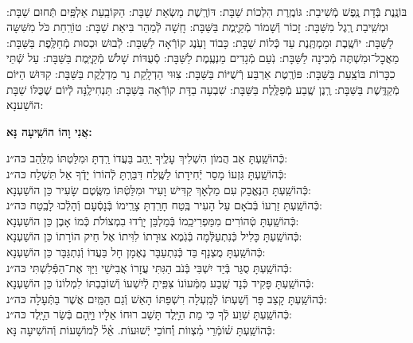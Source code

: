 \documentclass[twoside, openany, parskip=half, 11pt]{book}
\begin{document}
\sepline

\\
בּוֹנֶֽנֶת בְּֿדָת נֶֽפֶשׁ מְֿשִׁיבַת: גּוֹמֶֽרֶת הִלְכוֹת שַׁבָּת: דּוֹרֶֽשֶׁת מַשְׂאַת שַׁבָּת: הַקּוֹבַֽעַת אַלְפַּֽיִם תְּֿחוּם שַׁבָּת: וּמְשִֽׁיבַת רֶֽגֶל מִשַּׁבָּת: זָכוֹר וְֿשָׁמוֹר מְֿקַיֶּֽמֶת בַּשַּׁבָּת: חָֽשָׁה לְֿמַהֵר בִּיאַת שַׁבָּת: טוֹרַֽחַת כֹּל מִשִּׁשָּה לַשַּׁבָּת: יוֹשֶֽׁבֶת וּמַמְתֶּֽנֶת עַד כְּֿלוֹת שַׁבָּת: כָּבוֹד וָעֹֽנֶג קוֹרְֿאָה לַשַּׁבָּת: לְֿבוּשׁ וּכְסוּת מְֿחַלֶּֽפֶת בַּשַּׁבָּת: מַאֲכׇל־וּמִשְׁתֶּה מְֿכִינָה לַשַּׁבָּת: נֹֽעַם מְֿגָדִים מַנְעֶֽמֶת לַשַּׁבָּת: סְֿעֻדּוֹת שָׁלֹשׁ מְֿקַיֶּֽמֶת בַּשַּׁבָּת: עַל שְֿׁתֵּי כִכָּרוֹת בּוֹצַֽעַת בַּשַּׁבָּת: פּוֹרֶֽטֶת אַרְבַּע רְֿשֻׁיּוֹת בַּשַּׁבָּת: צִוּוּי הַדְלָֽקַת נֵר מַדְלֶֽקֶת בַּשַּׁבָּת: קִדּוּשׁ הַיּוֹם מְֿקַדֶּֽשֶׁת בַּשַּׁבָּת: רֶֽנֶן שֶֽׁבַע מְֿפַלֶּֽלֶת בַּשַּׁבָּת: שִׁבְעָה בַדָּת קוֹרְֿאָה בַּשַּׁבָּת: תַּנְחִילֶֽנָּה לְֿיוֹם שֶׁכֻּלּוֹ שַׁבָּת הוֹשַׁענָא:

\begin{large}
	\textbf{אֲנִי וָהוֹ הוֹשִֽׁיעָה נָּא:}
\end{large}

\begin{small}
	כְּֿהוֹשַֽׁעְתָּ אַב הֲמוֹן הִשְׁלִיךְ עָלֶֽיךָ יַֽהַב בַּעֲדוֹ רַֽדְתָּ וּמִלַּטְתּוֹ מִלַּֽהַב \hfill כּה״נ:\\
	כְּֿהוֹשַֽׁעְתָּ גִּזְעוֹ מָסַר יְֿחִידָתוֹ לַשֶּֽׁלַח דִּבַּרְֽתָּ לְֿהוֹרוֹ יָדְֿךָ אַל תִּשְׁלַח \hfill כּה״נ: \\
	כְּֿהוֹשַֽׁעְתָּ הַנֶּאֱבַק עִם מַלְאָךְ קַדִּישׁ וָעִיר וּמִלַּטְֿתּוֹ מִשֶּֽׂטֶם שָׂעִיר \hfill כֵּן הוֹשַׁעְנָא: \\
	כְּֿהוֹשַֽׁעְתָּ זַרְעוֹ בְּֿבֹאָם עַל הָעִיר בֶּֽטַח חָרַֽדְתָּ צָרֵֽימוֹ בְּֿנָסְֿעָם וְֿהָלְֿכוּ לָבֶֽטַח \hfill כּה״נ: \\
	כְּֿהוֹשַֽׁעְתָּ טְֿהוֹרִים מִמַּפְרִיכֵֽמוֹ בְּֿמַלְבֵּן יָרְֿדוּ בִמְצוֹלֹת כְּֿמוֹ אָבֶן \hfill כֵּן הוֹשַׁעְנָא: \\
	כְּֿהוֹשַֽׁעְתָּ כָּלִיל כְּֿנִתְעַלְּֿמָה בְּֿגֹֽמֶא צוּרָתוֹ לִוִּיתוֹ אֶל חֵיק הוֹרָתוֹ \hfill כֵּן הוֹשַׁעְנָא: \\
	כְּֿהוֹשַֽׁעְתָּ מֻצְנָף בַּד כְּֿנִתְעַבָּר נֶאֶמָן חָל בַּעֲדוֹ וְֿנִתְגַּבָּר \hfill כֵּן הוֹשַׁעְנָא: \\
	כְּֿהוֹשַֽׁעְתָּ סֻגַּר בְּֿיַד יִשְׁבִּי בְּֿנֹב הַגִּתִּי עֲזָרוֹ אֲבִישַׁי וַיַּךְ אֶת־הַפְּֿלִשְׁתִּי \hfill כּה״נ:\\
	כְּֿהוֹשַֽׁעְתָּ פָּקִיד כְּֿנָד שֶֽׁבַע מִמְּֿעוֹנוֹ צִּפִּֽיתָ לְֿיִשְׁעוֹ וְֿשׁוֹבַבְתּוֹ לִמְלוֹנוֹ \hfill כֵּן הוֹשַׁעְנָא:\\
	כְּֿהוֹשַֽׁעְתָּ קָצַב פָּר וְֿשַׁעְתּוֹ לְֿמַֽעְלָה רִשְׁפַּתּוֹ הָאֵשׁ וְֿגַם הַמַּֽיִם אֲשֶׁר בַּתְּֿעָלָה \hfill כּה״נ:\\
	כְּֿהוֹשַֽׁעְתָּ שִׁוַע לְֿךָ כִּי מֵת הַיָּֽלֶד תָּשֵׁב רוּחוֹ אֵלָיו וַיָּֽהָם בְּֿשַׂר הַיָּֽלֶד \hfill כּה״נ:\\
	כְּֿהוֹשַֽׁעְתָּ שׁ֗וֹמְֿרֵי מִ֗צְווֹת וְֿ֗חוֹכֵי יְֿשׁוּעוֹת. אֵ֗ל֗ לְֿמוֹשָׁעוֹת \hfill וְֿהוֹשִׁיעָה נָּא:\\
	
\end{small}
\end{document}
